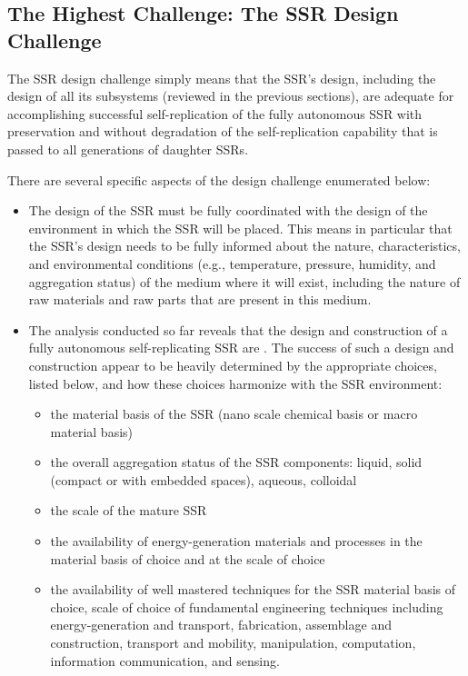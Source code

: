 \subsection[The Highest Challenge: The SSR Design Challenge]{The Highest
Challenge: The SSR Design Challenge}

The SSR design challenge simply
means that the SSR's design, including the design of all its subsystems
(reviewed in the previous sections), are adequate for accomplishing 
successful self-replication of the fully autonomous SSR with
preservation and without degradation of the self-replication capability
that is passed to all generations of daughter SSRs.

There are several specific aspects of the design challenge enumerated
below:

\begin{itemize}
\item The design of the SSR must be fully coordinated with the design
of the environment in which the SSR will be
placed. This means in particular that the SSR's design needs to be fully
informed about the nature, characteristics, and environmental conditions
(e.g., temperature, pressure, humidity, and aggregation status) of the medium
where it will exist, including the nature of raw materials and raw
parts that are present in this medium.
\item The analysis conducted so far reveals that the
design and construction of a fully autonomous self-replicating SSR are
. The success of such a design and
construction appear to be heavily determined by the appropriate choices,
listed below, and how these choices harmonize with the SSR
environment:

\begin{itemize}
\item the material basis of the SSR (nano scale chemical basis or macro material basis)
\item the overall aggregation status of the SSR components: liquid,
solid (compact or with embedded spaces), aqueous, colloidal
\item the scale of the mature SSR 
\item the availability of energy-generation materials and processes in
the material basis of choice and at the scale of choice
\item the availability of well mastered techniques for the SSR material
basis of choice, scale of choice of fundamental engineering techniques
including energy-generation and transport, fabrication, assemblage and construction, transport and mobility, manipulation, computation, information communication, and sensing.
\end{itemize}
\end{itemize}

